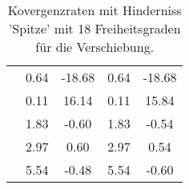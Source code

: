 \begin{table}
\begin{tabular}{c|cc|cc|}
\multicolumn{1}{|c|}{} & \multicolumn{1}{|c|}{      0.64} & \multicolumn{1}{|c|}{    -18.68} & \multicolumn{1}{|c|}{      0.64} & \multicolumn{1}{|c|}{    -18.68} \\ 
\multicolumn{1}{|c|}{} & \multicolumn{1}{|c|}{      0.11} & \multicolumn{1}{|c|}{     16.14} & \multicolumn{1}{|c|}{      0.11} & \multicolumn{1}{|c|}{     15.84} \\ 
\multicolumn{1}{|c|}{} & \multicolumn{1}{|c|}{      1.83} & \multicolumn{1}{|c|}{     -0.60} & \multicolumn{1}{|c|}{      1.83} & \multicolumn{1}{|c|}{     -0.54} \\ 
\multicolumn{1}{|c|}{} & \multicolumn{1}{|c|}{      2.97} & \multicolumn{1}{|c|}{      0.60} & \multicolumn{1}{|c|}{      2.97} & \multicolumn{1}{|c|}{      0.54} \\ 
\multicolumn{1}{|c|}{} & \multicolumn{1}{|c|}{      5.54} & \multicolumn{1}{|c|}{     -0.48} & \multicolumn{1}{|c|}{      5.54} & \multicolumn{1}{|c|}{     -0.60} \\ 
\hline 
\end{tabular}\caption{Kovergenzraten mit Hinderniss 'Spitze' mit 18 Freiheitsgraden für die Verschiebung.}\label{tab:Rate_Spitze_level0}
\end{table} 

